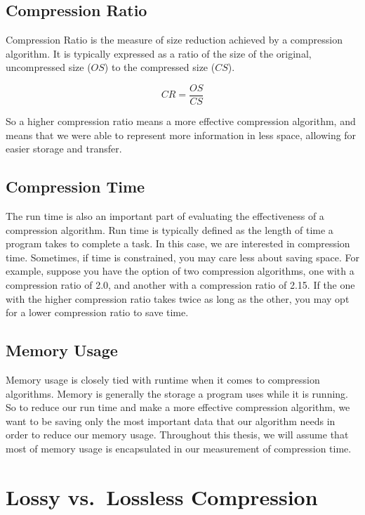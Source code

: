 \documentclass[12pt,twoside]{reedthesis}
\begin{document}
\hypertarget{compression-ratio}{%
\subsection{Compression Ratio}\label{compression-ratio}}

Compression Ratio is the measure of size reduction achieved by a compression algorithm. It is typically expressed as a ratio of the size of the original, uncompressed size (\(OS\)) to the compressed size (\(CS\)).

\[CR = \frac{OS}{CS}\]

So a higher compression ratio means a more effective compression algorithm, and means that we were able to represent more information in less space, allowing for easier storage and transfer.

\hypertarget{compression-time}{%
\subsection{Compression Time}\label{compression-time}}

The run time is also an important part of evaluating the effectiveness of a compression algorithm. Run time is typically defined as the length of time a program takes to complete a task. In this case, we are interested in compression time. Sometimes, if time is constrained, you may care less about saving space. For example, suppose you have the option of two compression algorithms, one with a compression ratio of 2.0, and another with a compression ratio of 2.15. If the one with the higher compression ratio takes twice as long as the other, you may opt for a lower compression ratio to save time.

\hypertarget{memory-usage}{%
\subsection{Memory Usage}\label{memory-usage}}

Memory usage is closely tied with runtime when it comes to compression algorithms. Memory is generally the storage a program uses while it is running. So to reduce our run time and make a more effective compression algorithm, we want to be saving only the most important data that our algorithm needs in order to reduce our memory usage. Throughout this thesis, we will assume that most of memory usage is encapsulated in our measurement of compression time.

\hypertarget{lossy-vs.-lossless-compression}{%
\section{Lossy vs.~Lossless Compression}\label{lossy-vs.-lossless-compression}}
\end{document}
